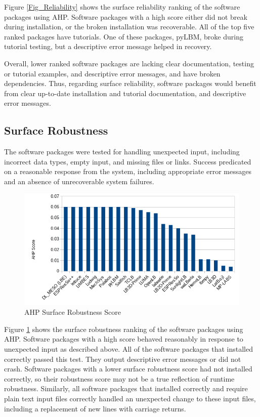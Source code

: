 \documentclass[12pt, notitlepage]{article}
\begin{document}
Figure \ref{Fig_Reliability} shows the surface reliability ranking of the software packages using AHP. Software packages with a high score either did not break during installation, or the broken installation was recoverable. All of the top five ranked packages have tutorials. One of these packages, pyLBM, broke during tutorial testing, but a descriptive error message helped in recovery.

Overall, lower ranked software packages are lacking clear documentation, testing or tutorial examples, and descriptive error messages, and have broken dependencies. Thus, regarding surface reliability, software packages would benefit from clear up-to-date installation and tutorial documentation, and descriptive error messages.

\subsection{Surface Robustness}

The software packages were tested for handling unexpected input, including incorrect data types, empty input, and missing files or links. Success predicated on a reasonable response from the system, including appropriate error messages and an absence of unrecoverable system failures. 

\begin{figure}[h!]
	\begin{center}
		\includegraphics[width=1.0\textwidth]{robustness_chart}
		\caption{AHP Surface Robustness Score}
		\label{Fig_Robustness}
	\end{center}
\end{figure}

Figure \ref{Fig_Robustness} shows the surface robustness ranking of the software packages using AHP. Software packages with a high score behaved reasonably in response to unexpected input as described above. All of the software packages that installed correctly passed this test. They output descriptive error messages or did not crash. Software packages with a lower surface robustness score had not installed correctly, so their robustness score may not be a true reflection of runtime robustness. Similarly, all software packages that installed correctly and require plain text input files correctly handled an unexpected change to these input files, including a replacement of new lines with carriage returns. 
\end{document}
